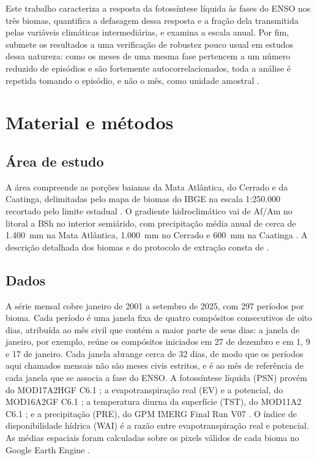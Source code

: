 \documentclass[a4paper,fleqn]{cas-sc}
\begin{document}
Este trabalho caracteriza a resposta da fotossíntese líquida às fases do ENSO nos três biomas, quantifica a defasagem dessa resposta e a fração dela transmitida pelas variáveis climáticas intermediárias, e examina a escala anual. Por fim, submete os resultados a uma verificação de robustez pouco usual em estudos dessa natureza: como os meses de uma mesma fase pertencem a um número reduzido de episódios e são fortemente autocorrelacionados, toda a análise é repetida tomando o episódio, e não o mês, como unidade amostral \citep{kunsch1989, politis1994}.

\section{Material e métodos}

\subsection{Área de estudo}

A área compreende as porções baianas da Mata Atlântica, do Cerrado e da Caatinga, delimitadas pelo mapa de biomas do IBGE na escala 1:250.000 recortado pelo limite estadual \citep{ibge2019}. O gradiente hidroclimático vai de Af/Am no litoral a BSh no interior semiárido, com precipitação média anual de cerca de 1.400~mm na Mata Atlântica, 1.000~mm no Cerrado e 600~mm na Caatinga \citep{alvares2013}. A descrição detalhada dos biomas e do protocolo de extração consta de \citet{oliveira2026}.

\subsection{Dados}

A série mensal cobre janeiro de 2001 a setembro de 2025, com 297 períodos por bioma. Cada período é uma janela fixa de quatro compósitos consecutivos de oito dias, atribuída ao mês civil que contém a maior parte de seus dias: a janela de janeiro, por exemplo, reúne os compósitos iniciados em 27 de dezembro e em 1, 9 e 17 de janeiro. Cada janela abrange cerca de 32 dias, de modo que os períodos aqui chamados mensais não são meses civis estritos, e é ao mês de referência de cada janela que se associa a fase do ENSO. A fotossíntese líquida (PSN) provém do MOD17A2HGF C6.1 \citep{running2021gpp}; a evapotranspiração real (EV) e a potencial, do MOD16A2GF C6.1 \citep{running2021et}; a temperatura diurna da superfície (TST), do MOD11A2 C6.1 \citep{wan2021}; e a precipitação (PRE), do GPM IMERG Final Run V07 \citep{huffman2023}. O índice de disponibilidade hídrica (WAI) é a razão entre evapotranspiração real e potencial. As médias espaciais foram calculadas sobre os pixels válidos de cada bioma no Google Earth Engine \citep{gorelick2017}.
\end{document}

